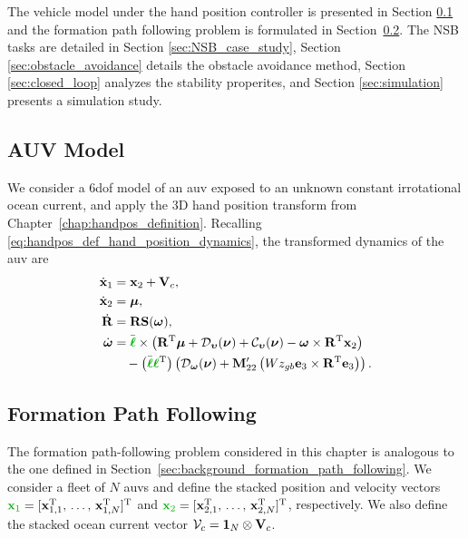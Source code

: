 The vehicle model under the hand position controller is presented in Section \ref{sec:vehicle_model} and the formation path following problem is formulated in Section~\ref{sec:formation_path_following}. The NSB tasks are detailed in Section \ref{sec:NSB_case_study}, Section \ref{sec:obstacle_avoidance} details the obstacle avoidance method, Section \ref{sec:closed_loop} analyzes the stability properites, and Section \ref{sec:simulation} presents a simulation study.

\subsection{AUV Model}\label{sec:vehicle_model}
We consider a 6\gls{dof} model of an \gls{auv} exposed to an unknown constant irrotational ocean current, and apply the 3D hand position transform from Chapter~\ref{chap:handpos_definition}.
Recalling \eqref{eq:handpos_def_hand_position_dynamics}, the transformed dynamics of the \gls{auv} are
\begin{subequations}\label{eq:linearized_system}
    \begin{align}
        \dot{\mathbf{x}}_1 &= \mathbf{x}_2 + \ocean,\\
        \dot{\mathbf{x}}_2 &= \bm{\mu},\\
        \dot{\mathbf{R}} &=  \mathbf{R} \mathbf{S}(\bm{\omega}),\\
        \dot{\bs{\omega}} &= \Bar{\dm{\handl}} \times \left(\mat{R}\T\bs{\mu} + \mathcal{D}_{\bvel}(\vel) + \mathcal{C}_{\bvel}(\vel) - \bs{\omega} \times \mat{R}\T \mat{x}_2\right) \label{eq:internal_dynamics} \\
            & \quad - \left(\Bar{\dm{\handl}}\dm{\handl}\T\right) \left(\mathcal{D}_{\bs{\omega}}(\vel) + \mat{M}_{22}^{\prime}\left(Wz_{gb} \mat{e}_3 \times \mat{R}\T \mat{e}_3\right)\right). \nonumber
    \end{align}
\end{subequations}

\subsection{Formation Path Following}\label{sec:formation_path_following}
The formation path-following problem considered in this chapter is analogous to the one defined in Section~\ref{sec:background_formation_path_following}.
We consider a fleet of $N$ \glspl{auv} and define the stacked position and velocity vectors $\dm{\mathbf{x}_1} = [\mathbf{x}_{1,1}\T, \, \ldots,\, \mathbf{x}_{1,N}\T]\T$ and $\dm{\mathbf{x}_2} = [\mathbf{x}_{2,1}\T, \, \ldots,\, \mathbf{x}_{2,N}\T]\T$, respectively. We also define the stacked ocean current vector $\mathcal{V}_c = \mathbf{1}_{N} \otimes \mathbf{V}_c$.

